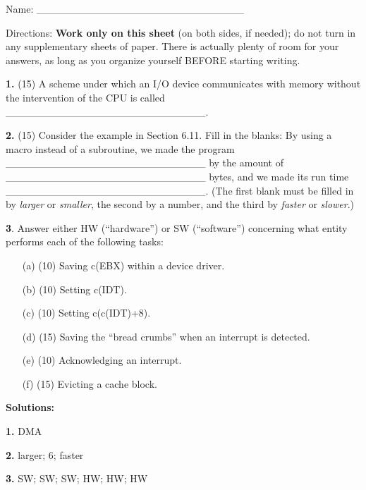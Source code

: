 \documentclass[twocolumn]{article}
\begin{document}
Name: \_\_\_\_\_\_\_\_\_\_\_\_\_\_\_\_\_\_\_\_\_\_\_\_\_\_\_\_

Directions: {\bf Work only on this sheet} (on both sides, if needed); do not
turn in any supplementary sheets of paper. There is actually plenty of room
for your answers, as long as you organize yourself BEFORE starting writing.

{\bf 1.} (15) A scheme under which an I/O device communicates with memory
without the intervention of the CPU is called 
\_\_\_\_\_\_\_\_\_\_\_\_\_\_\_\_\_\_\_\_\_\_\_\_\_\_\_.

{\bf 2.} (15) Consider the example in Section 6.11.  Fill in the blanks:
By using a macro instead of a subroutine, we made the program
\_\_\_\_\_\_\_\_\_\_\_\_\_\_\_\_\_\_\_\_\_\_\_\_\_\_\_ by the amount of 
\_\_\_\_\_\_\_\_\_\_\_\_\_\_\_\_\_\_\_\_\_\_\_\_\_\_\_ bytes, and we
made its run time 
\_\_\_\_\_\_\_\_\_\_\_\_\_\_\_\_\_\_\_\_\_\_\_\_\_\_\_.  (The first
blank must be filled in by {\it larger} or {\it smaller}, the second by
a number, and the third by {\it faster} or {\it slower}.)

{\bf 3}. Answer either HW (``hardware'') or SW (``software'')
concerning what entity performs each of the following tasks:

\begin{itemize}

\item [(a)] (10) Saving c(EBX) within a device driver.

\item [(b)] (10) Setting c(IDT).

\item [(c)] (10) Setting c(c(IDT)+8).

\item [(d)] (15) Saving the ``bread crumbs'' when an interrupt is
detected.

\item [(e)] (10) Acknowledging an interrupt.

\item [(f)] (15) Evicting a cache block.

\end{itemize}

{\bf Solutions:}

{\bf 1.} DMA

{\bf 2.} larger; 6; faster

{\bf 3.} SW; SW; SW; HW; HW; HW
\end{document}
